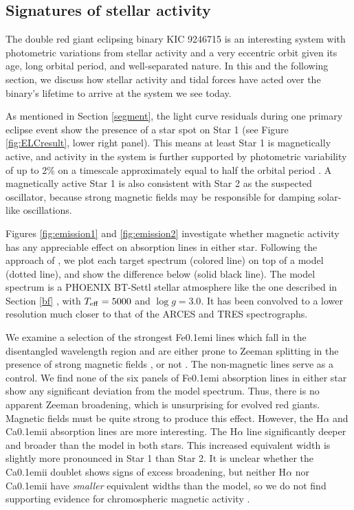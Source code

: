 \subsection{Signatures of stellar activity}\label{actrot}
The double red giant eclipsing binary KIC 9246715 is an interesting system with photometric variations from stellar activity and a very eccentric orbit given its age, long orbital period, and well-separated nature. In this and the following section, we discuss how stellar activity and tidal forces have acted over the binary's lifetime to arrive at the system we see today.

As mentioned in Section \ref{segment}, the light curve residuals during one primary eclipse event show the presence of a star spot on Star 1 (see Figure \ref{fig:ELCresult}, lower right panel). This means at least Star 1 is magnetically active, and activity in the system is further supported by photometric variability of up to 2\% on a timescale approximately equal to half the orbital period \citep{gau14}. A magnetically active Star 1 is also consistent with Star 2 as the suspected oscillator, because strong magnetic fields may be responsible for damping solar-like oscillations.

Figures \ref{fig:emission1} and \ref{fig:emission2} investigate whether magnetic activity has any appreciable effect on absorption lines in either star. Following the approach of \citet{fro12}, we plot each target spectrum (colored line) on top of a model (dotted line), and show the difference below (solid black line). The model spectrum is a PHOENIX BT-Settl stellar atmosphere like the one described in Section \ref{bf} \citep{all03,asp09}, with $T_{\rm{eff}} = 5000$ and $\log g = 3.0$. It has been convolved to a lower resolution much closer to that of the ARCES and TRES spectrographs.

We examine a selection of the strongest {\rm Fe}\kern 0.1em{\sc i} lines which fall in the disentangled wavelength region and are either prone to Zeeman splitting in the presence of strong magnetic fields \citep{har73}, or not \citep{sis70}. The non-magnetic lines serve as a control. We find none of the six panels of {\rm Fe}\kern 0.1em{\sc i} absorption lines in either star show any significant deviation from the model spectrum. Thus, there is no apparent Zeeman broadening, which is unsurprising for evolved red giants. Magnetic fields must be quite strong to produce this effect. However, the H$\alpha$ and {\rm Ca}\kern 0.1em{\sc ii} absorption lines are more interesting. The H$\alpha$ line significantly deeper and broader than the model in both stars. This increased equivalent width is slightly more pronounced in Star 1 than Star 2. It is unclear whether the {\rm Ca}\kern 0.1em{\sc ii} doublet shows signs of excess broadening, but neither H$\alpha$ nor {\rm Ca}\kern 0.1em{\sc ii} have \emph{smaller} equivalent widths than the model, so we do not find supporting evidence for chromospheric magnetic activity \citep{fro12}.

  
  
  
  
  
  
  
  